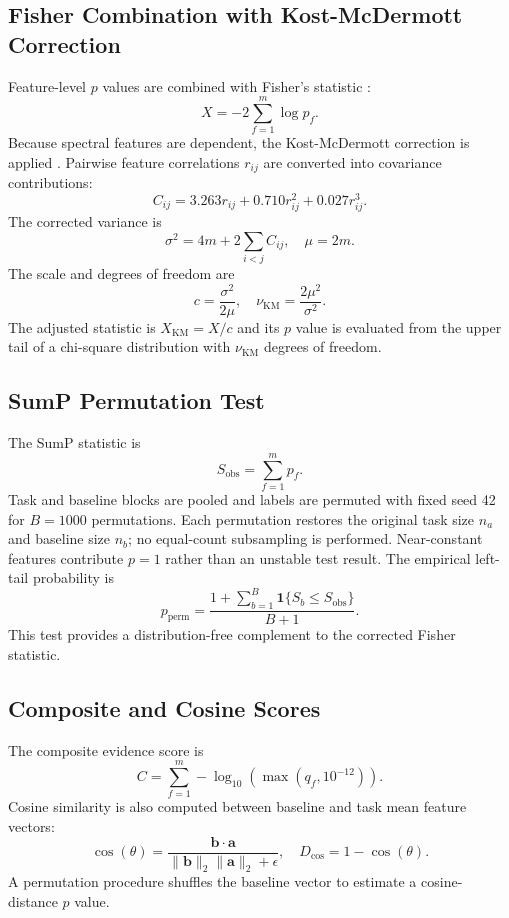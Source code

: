 \documentclass[conference]{IEEEtran}
\begin{document}
\subsection{Fisher Combination with Kost-McDermott Correction}
Feature-level $p$ values are combined with Fisher's statistic \cite{fisher1925}:
\begin{equation}
X=-2\sum_{f=1}^{m}\log p_f.
\end{equation}
Because spectral features are dependent, the Kost-McDermott correction is applied \cite{kost2002}. Pairwise feature correlations $r_{ij}$ are converted into covariance contributions:
\begin{equation}
C_{ij}=3.263r_{ij}+0.710r_{ij}^2+0.027r_{ij}^3 .
\end{equation}
The corrected variance is
\begin{equation}
\sigma^2=4m+2\sum_{i<j}C_{ij},\quad \mu=2m.
\end{equation}
The scale and degrees of freedom are
\begin{equation}
c=\frac{\sigma^2}{2\mu},\quad \nu_{\mathrm{KM}}=\frac{2\mu^2}{\sigma^2}.
\end{equation}
The adjusted statistic is $X_{\mathrm{KM}}=X/c$ and its $p$ value is evaluated from the upper tail of a chi-square distribution with $\nu_{\mathrm{KM}}$ degrees of freedom.

\subsection{SumP Permutation Test}
The SumP statistic is
\begin{equation}
S_{\mathrm{obs}}=\sum_{f=1}^{m}p_f .
\end{equation}
Task and baseline blocks are pooled and labels are permuted with fixed seed 42 for $B=1000$ permutations. Each permutation restores the original task size $n_a$ and baseline size $n_b$; no equal-count subsampling is performed. Near-constant features contribute $p=1$ rather than an unstable test result. The empirical left-tail probability is
\begin{equation}
p_{\mathrm{perm}}=\frac{1+\sum_{b=1}^{B}\mathbf{1}\{S_b\le S_{\mathrm{obs}}\}}{B+1}.
\end{equation}
This test provides a distribution-free complement to the corrected Fisher statistic.

\subsection{Composite and Cosine Scores}
The composite evidence score is
\begin{equation}
C=\sum_{f=1}^{m}-\log_{10}(\max(q_f,10^{-12})).
\end{equation}
Cosine similarity is also computed between baseline and task mean feature vectors:
\begin{equation}
\cos(\theta)=\frac{\mathbf{b}\cdot\mathbf{a}}
{\|\mathbf{b}\|_2\|\mathbf{a}\|_2+\epsilon},
\quad D_{\cos}=1-\cos(\theta).
\end{equation}
A permutation procedure shuffles the baseline vector to estimate a cosine-distance $p$ value.
\end{document}
